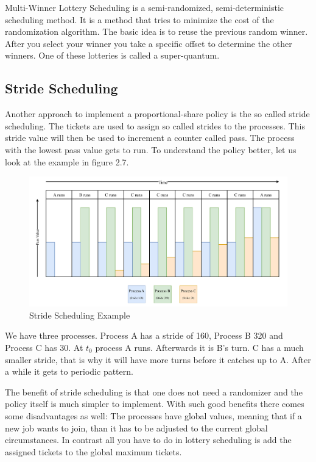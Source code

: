 Multi-Winner Lottery Scheduling is a semi-randomized, semi-deterministic scheduling method.
It is a method that tries to minimize the cost of the randomization algorithm.
The basic idea is to reuse the previous random winner.
After you select your winner you take a specific offset to determine the other winners.
One of these lotteries is called a super-quantum.

\subsection{Stride Scheduling}

Another approach to implement a proportional-share policy is the so called stride scheduling.
The tickets are used to assign so called strides to the processes.
This stride value will then be used to increment a counter called pass.
The process with the lowest pass value gets to run.
To understand the policy better, let us look at the example in figure 2.7.

\begin{figure}[h]
    \centering
    \includegraphics[width=\textwidth]{Assets/Stride-Scheduling.pdf}
    \caption{Stride Scheduling Example}\label{fig:stride-scheduling}
\end{figure}

We have three processes. Process A has a stride of 160, Process B 320 and Process C has 30. At $t_0$ process A runs. Afterwards it is B's turn. C has a much smaller stride, that is why it will have more turns before it catches up to A.
After a while it gets to periodic pattern.


The benefit of stride scheduling is that one does not need a randomizer and the policy itself is much simpler to implement. With such good benefits there comes some disadvantages as well: The processes have global values, meaning that if a new job wants to join, than it has to be adjusted to the current global circumstances. In contrast all you have to do in lottery scheduling is add the assigned tickets to the global maximum tickets.

